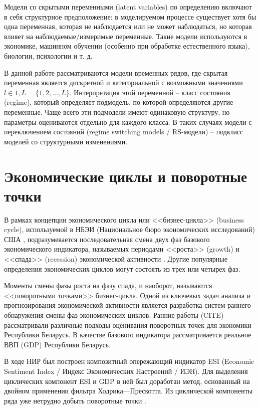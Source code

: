 \documentclass[a4paper,14pt]{extreport}
\begin{document}
Модели со скрытыми переменными (latent variables) по определению включают в себя структурное предположение: в моделируемом процессе существует хотя бы одна переменная, которая не наблюдается или не может наблюдаться, но которая влияет на наблюдаемые/измеримые переменные. Такие модели используются в экономике, машинном обучении (особенно при обработке естественного языка), биологии, психологии и т. д.

В данной работе рассматриваются модели временных рядов, где скрытая переменная является дискретной и категориальной с возможными значениями $l \in \overline{1,L} = \{1,2,\dots,L\}$. Интерпретация этой переменной -- класс состояния (regime), который определяет подмодель, по которой определяются другие переменные. Чаще всего эти подмодели имеют одинаковую структуру, но параметры оцениваются отдельно для каждого класса. В таких случаях модели с переключением состояний (regime switching models / RS-модели) – подкласс моделей со структурными изменениями.

\section{Экономические циклы и поворотные точки}

В рамках концепции экономического цикла или <<бизнес-цикла>> (business cycle), используемой в НБЭИ (Национальное бюро экономических исследований) США \cite{nberDevelopment}, подразумевается последовательная смена двух фаз базового экономического индикатора, называемых периодами <<роста>> (growth) и <<спада>> (recession) экономической активности \cite{oecdCycleExtraction}. Другие популярные определения экономических циклов могут состоять из трех или четырех фаз.

Моменты смены фазы роста на фазу спада, и наоборот, называются <<поворотными точками>> бизнес-цикла. Одной из ключевых задач анализа и прогнозирования экономической активности является разработка систем раннего обнаружения смены фаз экономических циклов.  Ранние работы (CITE) рассматривали различные подходы оценивания поворотных точек для экономики Республики Беларусь. В качестве базового индикатора рассматривается реальное ВВП (GDP) Республики Беларусь.

В ходе НИР \cite{esiMaking} был построен композитный опережающий индикатор ESI (Economic Sentiment Index / Индекс Экономических Настроений / ИЭН). Для выделения циклических компонент ESI и GDP в ней был доработан метод, основанный на двойном применении фильтра Ходрика—Прескотта. Из циклической компоненты ряда уже нетрудно добыть поворотные точки \cite{esiMaking, esiExtra}. 
\end{document}
